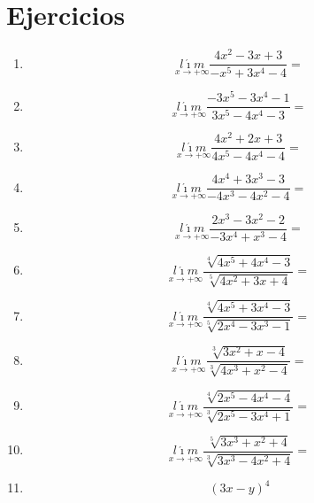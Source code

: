 \documentclass[oneside,spanish,letter]{article}
\begin{document}
\section{Ejercicios}
\begin{enumerate}
 \item $$\underset{x\rightarrow +\infty}{l\acute{\imath}m} \frac{4x^2-3x+3}{-x^5+3x^4-4}=$$
 \item $$\underset{x\rightarrow +\infty}{l\acute{\imath}m} \frac{-3x^5-3x^4-1}{3x^5-4x^4-3}=$$
 \item $$\underset{x\rightarrow +\infty}{l\acute{\imath}m} \frac{4x^2+2x+3}{4x^5-4x^4-4}=$$
 \item $$\underset{x\rightarrow +\infty}{l\acute{\imath}m} \frac{4x^4+3x^3-3}{-4x^3-4x^2-4}=$$
 \item $$\underset{x\rightarrow +\infty}{l\acute{\imath}m} \frac{2x^3-3x^2-2}{-3x^4+x^3-4}=$$
 \item $$\underset{x\rightarrow +\infty}{l\acute{\imath}m} \frac{\sqrt[4]{4x^5+4x^4-3}}{\sqrt[5]{4x^2+3x+4}}=$$
 \item $$\underset{x\rightarrow +\infty}{l\acute{\imath}m} \frac{\sqrt[4]{4x^5+3x^4-3}}{\sqrt[5]{2x^4-3x^3-1}}=$$
 \item $$\underset{x\rightarrow +\infty}{l\acute{\imath}m} \frac{\sqrt[3]{3x^2+x-4}}{\sqrt[3]{4x^3+x^2-4}}=$$
 \item $$\underset{x\rightarrow +\infty}{l\acute{\imath}m} \frac{\sqrt[4]{2x^5-4x^4-4}}{\sqrt[3]{2x^5-3x^4+1}}=$$
 \item $$\underset{x\rightarrow +\infty}{l\acute{\imath}m} \frac{\sqrt[5]{3x^3+x^2+4}}{\sqrt[3]{3x^3-4x^2+4}}=$$
\item $$(3x-y)^4$$
 \end{enumerate}
  \newpage
\end{document}
